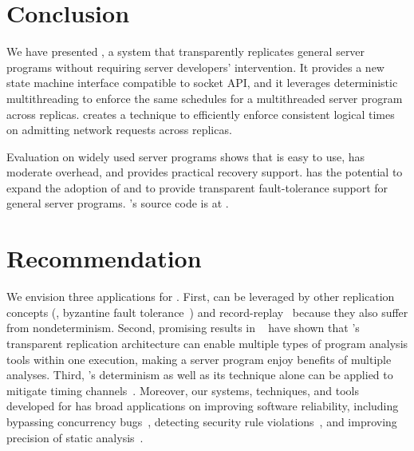 \section{Conclusion} \label{sec:conclusion}
We have presented \xxx, a \smr system that 
transparently replicates general server programs without 
requiring server developers' intervention. It provides a new state machine 
interface compatible to socket API, and it leverages 
deterministic multithreading to enforce the same schedules for a multithreaded 
server program across replicas. \xxx creates a \timealgo technique to 
efficiently enforce consistent logical times on admitting network requests 
across replicas.

Evaluation on \nprog widely used server programs shows that 
\xxx is easy to use, has moderate overhead, and provides practical recovery 
support. \xxx has the potential to expand the adoption of \smr and to provide 
transparent fault-tolerance support for general server programs. \xxx's 
source code is at \github.

\section{Recommendation} \label{sec:recommendation}
We envision three applications for \xxx. First, \xxx can 
be leveraged by other replication concepts (\eg, byzantine fault 
tolerance~\cite{pbft:osdi99, zyzzyva:sosp07}) 
and record-replay~\cite{scribe:sigmetrics10, racepro:sosp11, respec:asplos10} 
because they also suffer from nondeterminism. Second, promising 
results in \repframe~\cite{repframe:apsys15} have shown that \xxx's transparent 
replication architecture can enable multiple types of program analysis tools 
within one execution, making a server program enjoy benefits of multiple 
analyses. Third, \xxx's determinism as well as its \timealgo technique alone 
can be applied to mitigate timing channels~\cite{Askarov:ccs10, Zhang:ccs11, 
Aviram:ccsw10}. Moreover, our systems, techniques, and tools developed 
for \xxx has broad applications on improving software reliability, 
including bypassing concurrency bugs~\cite{wu:loom:osdi10}, detecting security 
rule violations~\cite{woodpecker:asplos13}, and improving precision of static 
analysis~\cite{wu:pldi12}. 

% 

